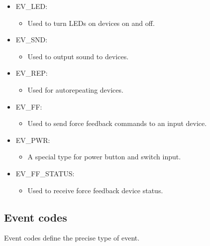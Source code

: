 \documentclass[a4paper,8pt,english]{sphinxmanual}
\begin{document}
\begin{itemize}
\begin{itemize}
\end{itemize}

\item {} 
EV\_LED:
\begin{itemize}
\item {} 
Used to turn LEDs on devices on and off.

\end{itemize}

\item {} 
EV\_SND:
\begin{itemize}
\item {} 
Used to output sound to devices.

\end{itemize}

\item {} 
EV\_REP:
\begin{itemize}
\item {} 
Used for autorepeating devices.

\end{itemize}

\item {} 
EV\_FF:
\begin{itemize}
\item {} 
Used to send force feedback commands to an input device.

\end{itemize}

\item {} 
EV\_PWR:
\begin{itemize}
\item {} 
A special type for power button and switch input.

\end{itemize}

\item {} 
EV\_FF\_STATUS:
\begin{itemize}
\item {} 
Used to receive force feedback device status.

\end{itemize}

\end{itemize}


\subsection{Event codes}
\label{input/event-codes:event-codes}
Event codes define the precise type of event.
\end{document}
